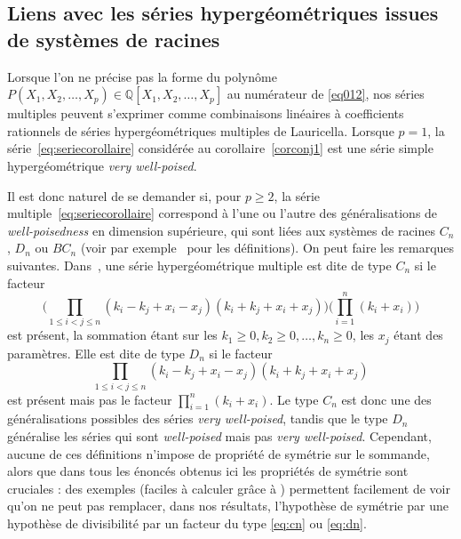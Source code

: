 \documentclass[12pt,francais, reqno]{smfart}
\numberwithin{equation}{section}
\begin{document}
\subsection{Liens avec les s\'eries hyperg\'eom\'etriques issues de syst\`emes de racines}
			 
Lorsque l'on ne pr\'ecise pas la forme du polyn\^ome 
$P(X_1,X_2,\ldots, X_p)\in\mathbb{Q}[X_1, X_2, \ldots, X_p]$ au 
num\'erateur de \eqref{eq012}, 
nos s\'eries multiples peuvent s'exprimer comme combinaisons
lin\'eaires \`a coefficients rationnels de s\'eries hyperg\'eom\'etriques multiples 
de Lauricella. Lorsque $p=1$, la s\'erie~\eqref{eq:seriecorollaire} consid\'er\'ee au corollaire~\ref{corconj1} est une s\'erie simple hyperg\'eom\'etrique {\em very well-poised}. 

Il est donc naturel de se demander si, pour $p \ge 2$, la s\'erie multiple~\eqref{eq:seriecorollaire} correspond \`a l'une ou l'autre des g\'en\'eralisations de {\em well-poisedness} en dimension sup\'erieure, qui sont li\'ees aux syst\`emes de racines $C_n$, $D_n$ ou $BC_n$ 
(voir par exemple~\cite{humphreys} pour les d\'efinitions). On peut faire les remarques suivantes.
Dans~\cite{schlosser}, une s\'erie hyperg\'eom\'etrique multiple est dite 
de type $C_n$ si le facteur 
\begin{equation}\label{eq:cn}
\Big(\prod_{1\le i<j\le n} (k_i-k_j+x_i-x_j)(k_i+k_j+x_i+x_j) \Big)
\Big(\prod_{i=1}^n (k_i+x_i)\Big)
\end{equation}
est pr\'esent, la sommation \'etant sur les $k_1 \ge 0, k_2\ge 0, \ldots, k_n\ge 0$, les $x_j$ \'etant des param\`etres. Elle est dite de type $D_n$ si le facteur 
\begin{equation}\label{eq:dn}
\prod_{1\le i<j\le n} (k_i-k_j+x_i-x_j)(k_i+k_j+x_i+x_j)
\end{equation}
est pr\'esent mais pas le facteur $\prod_{i=1}^n (k_i+x_i)$. Le type $C_n$ est donc une des g\'en\'eralisations possibles des s\'eries  {\em very well-poised}, tandis que le type $D_n$ g\'en\'eralise les s\'eries qui sont   {\em well-poised} mais pas  {\em very well-poised}. Cependant, aucune de ces d\'efinitions n'impose de propri\'et\'e de sym\'etrie sur le sommande, alors que dans tous les \'enonc\'es obtenus ici les propri\'et\'es de sym\'etrie sont cruciales : des exemples (faciles \`a calculer gr\^ace \`a \cite{CFRweb}) permettent facilement de voir qu'on ne peut pas remplacer, dans nos r\'esultats, l'hypoth\`ese de sym\'etrie par une hypoth\`ese de divisibilit\'e par un facteur du type \eqref{eq:cn} ou \eqref{eq:dn}. 
\end{document}
